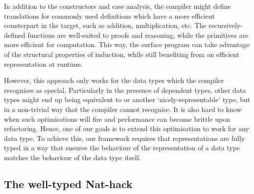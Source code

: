 In addition to the constructors and case analysis, the compiler might define
translations for commonly used definitions which have a more efficient
counterpart in the target, such as addition, multiplication,
etc. The recursively-defined functions are well-suited to proofs and reasoning,
while the primitives are more efficient for computation. This way, the surface
program can take advantage of the structural properties of induction, 
while still benefiting from an efficient representation at runtime.

However, this approach only works for the data types which the
compiler recognises as special. Particularly in the presence of dependent
types, other data types might end up being equivalent to  or
another `nicely-representable' type, but in a non-trivial way that the compiler
cannot recognise. It is also hard to know when such optimisations will fire
and performance can become brittle upon refactoring.
Hence, one of our goals is to extend this optimisation to work
for any data type. To achieve this, our framework requires that
representations are fully typed in a way that ensures the behaviour of the
representation of a data type matches the behaviour of the data type itself.

\subsection{The well-typed Nat-hack}

